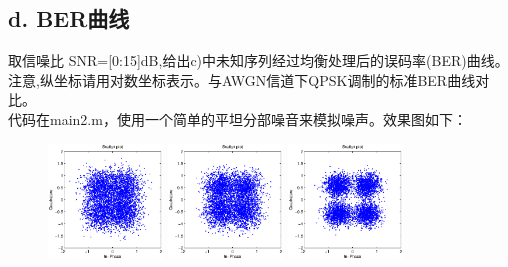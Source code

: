 \documentclass{article}
\begin{document}
\subsection*{d. BER曲线}
取信噪比 SNR=[0:15]dB,给出c)中未知序列经过均衡处理后的误码率(BER)曲线。
注意,纵坐标请用对数坐标表示。与AWGN信道下QPSK调制的标准BER曲线对比。\\
代码在main2.m，使用一个简单的平坦分部噪音来模拟噪声。效果图如下：
\begin{figure}[h]
\begin{minipage}[t]{0.32\linewidth}
\centering
\includegraphics[width=1.2in]{61.eps}
\end{minipage}%
\begin{minipage}[t]{0.32\linewidth}
\centering
\includegraphics[width=1.2in]{62.eps}
\end{minipage}%
\begin{minipage}[t]{0.32\linewidth}
\centering
\includegraphics[width=1.2in]{65.eps}
\end{minipage}%
\end{figure}
\end{document}
